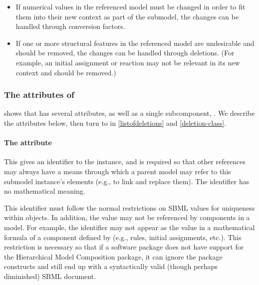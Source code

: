 \begin{itemize}

\item If numerical values in the referenced model must be changed in order to fit them into their new context as part of the submodel, the changes can be handled through conversion factors. 

\item If one or more structural features in the referenced model are undesirable and should be removed, the changes can be handled through deletions.  (For example, an initial assignment or reaction may not be relevant in its new context and should be removed.)

\end{itemize}


\subsubsection{The attributes of }

 shows that \Submodel has several attributes, as well as a single subcomponent, .  We describe the attributes below, then turn to  in \ref{listofdeletions} and \ref{deletion-class}.


\paragraph{The \fixttspace{} attribute}

  This gives an identifier to the \Submodel instance, and is required so that other references may always have a means through which a parent model may refer to this submodel instance's elements (e.g., to link and replace them).  The identifier has no mathematical meaning.

This identifier must follow the normal restrictions on SBML  values for uniqueness within \Model objects.  In addition, the  value may not be referenced by \sbmlthreecore components in a model.  For example, the identifier may not appear as the  value in a mathematical formula of a component defined by \sbmlthreecore (e.g., rules, initial assignments, etc.). This restriction is necessary so that if a software package does not have support for the Hierarchical Model Composition package, it can ignore the package constructs and still end up with a syntactically valid (though perhaps diminished) SBML document.



